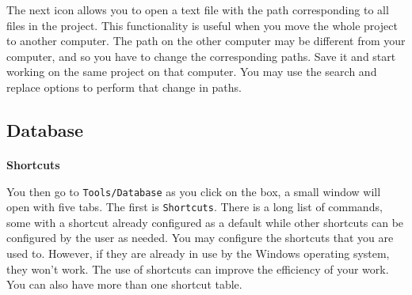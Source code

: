 The next icon allows you to open a text file with the path corresponding to all files in the project.
This functionality is useful when you move the whole project to another computer.
The path on the other computer may be different from your computer, and so you have to change the corresponding paths.
Save it and start working on the same project on that computer.
You may use the search and replace options to perform that change in paths.


\subsection{Database}

\paragraph{}\textbf{Shortcuts}\\

You then go to \texttt{Tools/Database} as you click on the box, a small window will open with five tabs.
The first is \texttt{Shortcuts}. There is a long list of commands, some with a shortcut already configured
as a default while other shortcuts can be configured by the user as needed.
You may configure the shortcuts that you are used to. However,
if they are already in use by the Windows operating system, they won't work.
The use of shortcuts can improve the efficiency of your work. You can also have more than one shortcut table.

